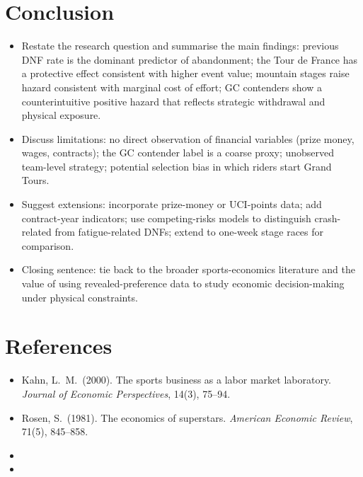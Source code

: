 \section{Conclusion}

\begin{itemize}
    \item Restate the research question and summarise the main findings: previous DNF rate is the dominant predictor of abandonment; the Tour de France has a protective effect consistent with higher event value; mountain stages raise hazard consistent with marginal cost of effort; GC contenders show a counterintuitive positive hazard that reflects strategic withdrawal and physical exposure.
    \item Discuss limitations: no direct observation of financial variables (prize money, wages, contracts); the GC contender label is a coarse proxy; unobserved team-level strategy; potential selection bias in which riders start Grand Tours.
    \item Suggest extensions: incorporate prize-money or UCI-points data; add contract-year indicators; use competing-risks models to distinguish crash-related from fatigue-related DNFs; extend to one-week stage races for comparison.
    \item Closing sentence: tie back to the broader sports-economics literature and the value of using revealed-preference data to study economic decision-making under physical constraints.
\end{itemize}


\section*{References}

\begin{itemize}
    \item Kahn, L.\ M.\ (2000). The sports business as a labor market laboratory. \textit{Journal of Economic Perspectives}, 14(3), 75--94.
    \item Rosen, S.\ (1981). The economics of superstars. \textit{American Economic Review}, 71(5), 845--858.
    \item [Add course lecture references: F1--F7]
    \item [Add any additional references used]
\end{itemize}


